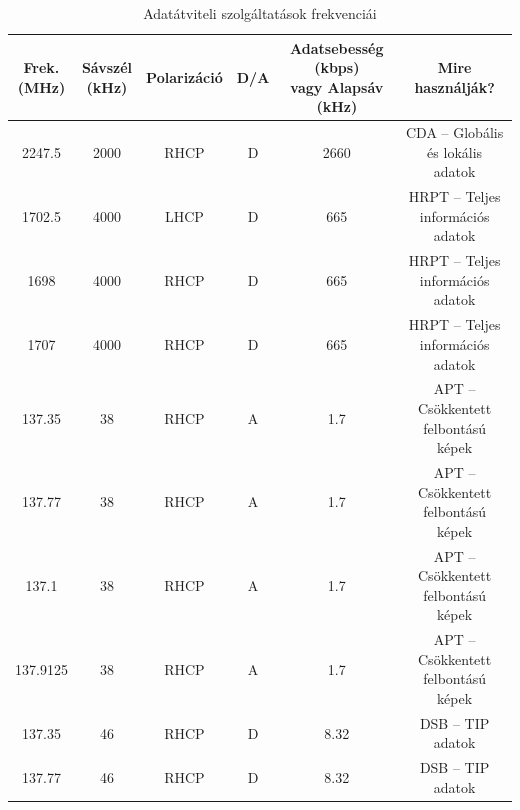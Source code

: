 \documentclass[a4paper,11pt]{article}
\begin{document}
\begin{table}[H]
  \centering
  \caption{Adatátviteli szolgáltatások frekvenciái}
  \label{tab:noaa19-data}
  \begin{tabular}{|c|c|c|c|c|c|}
    \hline
    \makecell{\textbf{Frek.}                                                            \\ \textbf{(MHz)}} &
    \makecell{\textbf{Sávszél}                                                          \\ \textbf{(kHz)}} &
    \textbf{Polarizáció} &
    \textbf{D/A}         &
    \makecell{\textbf{Adatsebesség (kbps)}                                              \\ \textbf{vagy Alapsáv (kHz)}} &
    \makecell{\textbf{Mire}                                                             \\ \textbf{használják?}} \\ \hline

    2247.5               & 2000 & RHCP & D & 2660 & \makecell{CDA – Globális és lokális \\ adatok} \\ \hline
    1702.5               & 4000 & LHCP & D & 665  & \makecell{HRPT – Teljes             \\ információs adatok} \\ \hline
    1698                 & 4000 & RHCP & D & 665  & \makecell{HRPT – Teljes             \\ információs adatok} \\ \hline
    1707                 & 4000 & RHCP & D & 665  & \makecell{HRPT – Teljes             \\ információs adatok} \\ \hline
    137.35               & 38   & RHCP & A & 1.7  & \makecell{APT – Csökkentett         \\ felbontású képek} \\ \hline
    137.77               & 38   & RHCP & A & 1.7  & \makecell{APT – Csökkentett         \\ felbontású képek} \\ \hline
    137.1                & 38   & RHCP & A & 1.7  & \makecell{APT – Csökkentett         \\ felbontású képek} \\ \hline
    137.9125             & 38   & RHCP & A & 1.7  & \makecell{APT – Csökkentett         \\ felbontású képek} \\ \hline
    137.35               & 46   & RHCP & D & 8.32 & \makecell{DSB – TIP                 \\ adatok} \\ \hline
    137.77               & 46   & RHCP & D & 8.32 & \makecell{DSB – TIP                 \\ adatok} \\ \hline
  \end{tabular}
\end{table}
\end{document}
